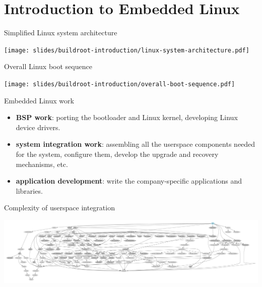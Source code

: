 \section{Introduction to Embedded Linux}

\begin{frame}{Simplified Linux system architecture}
  \begin{center}
    \texttt{[image: slides/buildroot-introduction/linux-system-architecture.pdf]}
  \end{center}
\end{frame}

\begin{frame}{Overall Linux boot sequence}
  \begin{center}
    \texttt{[image: slides/buildroot-introduction/overall-boot-sequence.pdf]}
  \end{center}
\end{frame}

\begin{frame}{Embedded Linux work}
  \begin{itemize}
  \item {\bf BSP work}: porting the bootloader and Linux kernel,
    developing Linux device drivers.
  \item {\bf system integration work}: assembling all the userspace
    components needed for the system, configure them, develop the
    upgrade and recovery mechanisms, etc.
  \item {\bf application development}: write the company-specific
    applications and libraries.
  \end{itemize}
\end{frame}

\begin{frame}{Complexity of userspace integration}
  \begin{center}
    \includegraphics[width=\textwidth]{slides/buildroot-introduction/graph-depends.pdf}
  \end{center}
\end{frame}

